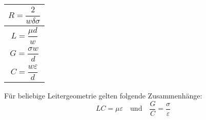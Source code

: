 
{\renewcommand*{\arraystretch}{0.2}
    \begin{tabularx}{0.5\columnwidth}{|X|}
        \hline
        \[R=\frac{2}{w\delta\sigma}\] \\
        \hline
        \[L=\frac{\mu d}{w}\]         \\
        \hline
        \[G=\frac{\sigma w}{d}\]      \\
        \hline
        \[C=\frac{w\varepsilon}{d}\]  \\
        \hline
    \end{tabularx}
}

\vspace{1ex}
Für beliebige Leitergeometrie gelten folgende Zusammenhänge:
\[
    LC = \mu\varepsilon \quad \text{und} \quad \frac{G}{C} = \frac{\sigma}{\varepsilon}
\]
\textbf{\color{red}{Leitungen gehen HIN und ZURÜCK!!!}\\
    \color{red}{Länge verdoppeln!!!}
}
